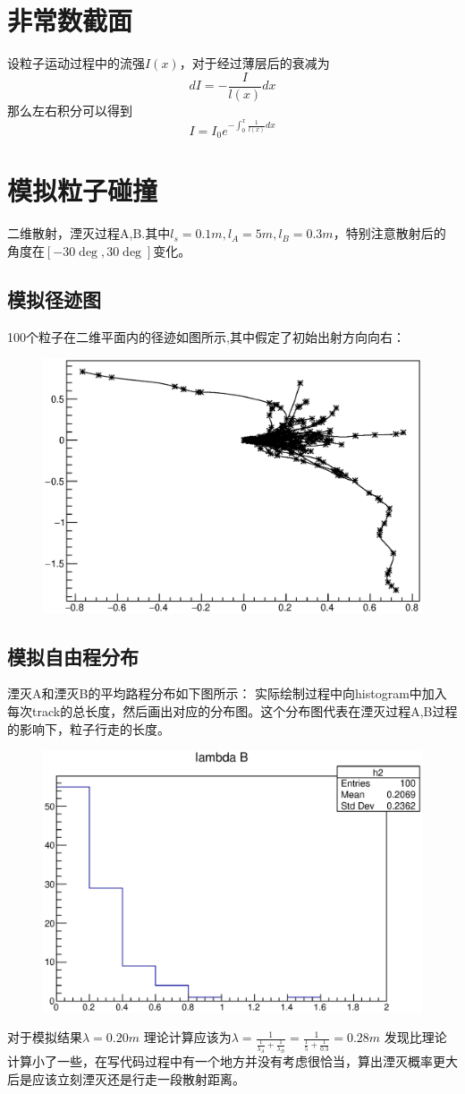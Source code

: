 \documentclass[UTF8]{ctexart}
\begin{document}
\section{非常数截面}
设粒子运动过程中的流强$I(x)$，对于经过薄层后的衰减为
\[dI=-\frac{I}{l(x)}dx\]
那么左右积分可以得到
\[I=I_0e^{-\int_0^x{\frac{1}{l(x)}dx}}\]
\section{模拟粒子碰撞}
二维散射，湮灭过程A,B.其中$l_s=0.1m,l_A=5m,l_B=0.3m$，特别注意散射后的角度在$[-30\deg,30\deg]$变化。
\subsection{模拟径迹图}
100个粒子在二维平面内的径迹如图所示,其中假定了初始出射方向向右：
\begin{figure}[h]
\includegraphics[width=.8\textwidth]{track100.eps}
\end{figure}
\subsection{模拟自由程分布}
湮灭A和湮灭B的平均路程分布如下图所示：
实际绘制过程中向histogram中加入每次track的总长度，然后画出对应的分布图。这个分布图代表在湮灭过程A,B过程的影响下，粒子行走的长度。
\begin{figure}[h]
\includegraphics[width=.8\textwidth]{distribution100.eps}
\end{figure}
对于模拟结果$\lambda=0.20m$
理论计算应该为$\lambda=\frac{1}{\frac{1}{\lambda_A}+\frac{1}{\lambda_B}}=\frac{1}{\frac{1}{5}+\frac{1}{0.3}}=0.28m$
发现比理论计算小了一些，在写代码过程中有一个地方并没有考虑很恰当，算出湮灭概率更大后是应该立刻湮灭还是行走一段散射距离。
\end{document}
